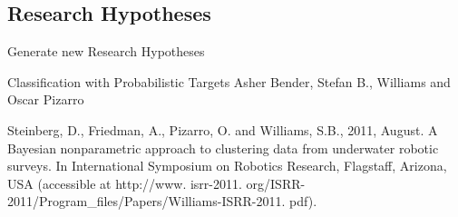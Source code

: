 \documentclass[12pt]{article}
\begin{document}
\subsection{Research Hypotheses}
Generate new Research Hypotheses

\begin{thebibliography}

Classification with Probabilistic Targets Asher Bender, Stefan B., Williams and Oscar Pizarro

Steinberg, D., Friedman, A., Pizarro, O. and Williams, S.B., 2011, August. A Bayesian nonparametric approach to clustering data from underwater robotic surveys. In International Symposium on Robotics Research, Flagstaff, Arizona, USA (accessible at http://www. isrr-2011. org/ISRR-2011/Program\_files/Papers/Williams-ISRR-2011. pdf).

\end{thebibliography}
\end{document}
